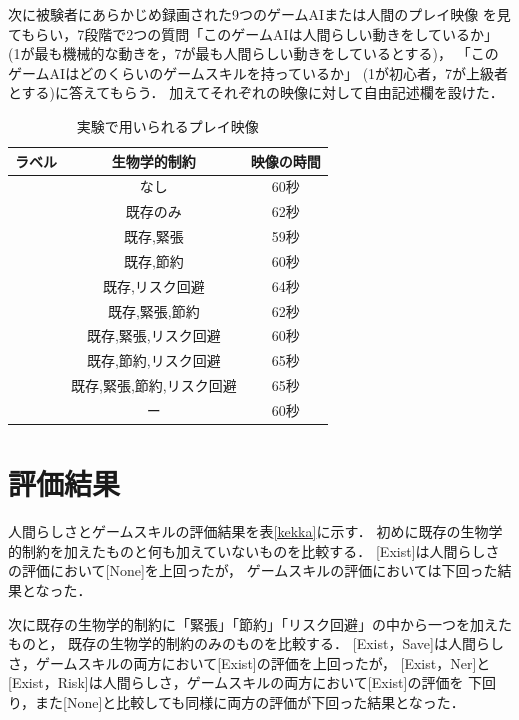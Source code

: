 \documentclass[a4paper,12pt,oneside,openany,titlepage]{jreport}
\begin{document}
 次に被験者にあらかじめ録画された9つのゲームAIまたは人間のプレイ映像
 を見てもらい，7段階で2つの質問「このゲームAIは人間らしい動きをしているか」
 (1が最も機械的な動きを，7が最も人間らしい動きをしているとする)，
 「このゲームAIはどのくらいのゲームスキルを持っているか」
 (1が初心者，7が上級者とする)に答えてもらう．
 加えてそれぞれの映像に対して自由記述欄を設けた．
 
 \begin{table}[!ht]
   \centering
   \caption{実験で用いられるプレイ映像}
   \label{eizo}
   \begin{tabular}{c|c|c}    
   \hline
       ラベル & 生物学的制約 & 映像の時間 \\ \hline
       [None] &  なし & 60秒 \\ \hline
       [Exist] & 既存のみ & 62秒 \\ \hline
       [Exist,Ner] & 既存,緊張 & 59秒 \\ \hline
       [Exist,Save] & 既存,節約 & 60秒 \\ \hline
       [Exist,Risk] & 既存,リスク回避 & 64秒 \\ \hline
       [Exist,Ner,Save] & 既存,緊張,節約 & 62秒 \\ \hline
       [Exist,Ner,Risk] & 既存,緊張,リスク回避 & 60秒 \\ \hline
       [Exist,Save,Risk] & 既存,節約,リスク回避 & 65秒 \\ \hline
       [Exist,Ner,Save,Risk] & 既存,緊張,節約,リスク回避 & 65秒 \\ \hline
       [Player] & ー & 60秒 \\ \hline
   \end{tabular}
 \end{table}
 
 \section{評価結果}
 人間らしさとゲームスキルの評価結果を表\ref{kekka}に示す．
 初めに既存の生物学的制約を加えたものと何も加えていないものを比較する．
 [Exist]は人間らしさの評価において[None]を上回ったが，
 ゲームスキルの評価においては下回った結果となった．
 
 次に既存の生物学的制約に「緊張」「節約」「リスク回避」の中から一つを加えたものと，
 既存の生物学的制約のみのものを比較する．
 [Exist，Save]は人間らしさ，ゲームスキルの両方において[Exist]の評価を上回ったが，
 [Exist，Ner]と[Exist，Risk]は人間らしさ，ゲームスキルの両方において[Exist]の評価を
 下回り，また[None]と比較しても同様に両方の評価が下回った結果となった．
 
\end{document}
